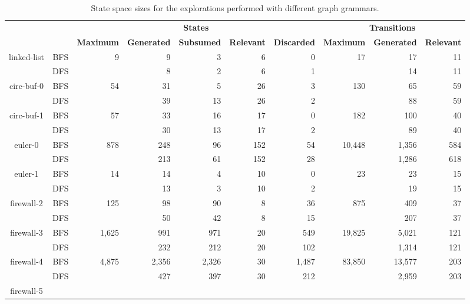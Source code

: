 \begin{table}[t]
\centering
\caption{State space sizes for the explorations performed with different graph
grammars.}
\scriptsize
\begin{tabular}{c|c|rrrrr|rrr}
\hline
\bf \multirow{2}{*}{Grammar} & \bf \multirow{2}{*}{Strat.} &
\multicolumn{5}{|c|}{\bf States} & \multicolumn{3}{|c}{\bf Transitions} \\
& & \bf Maximum & \bf Generated & \bf Subsumed & \bf Relevant & \bf Discarded
& \bf Maximum & \bf Generated & \bf Relevant \\
\hline
\multirow{2}{*}{linked-list} &
BFS & \multirow{2}{*}{9} & 9 & 3 & 6 & 0 & \multirow{2}{*}{17} & 17 & 11 \\
& DFS & & 8 & 2 & 6 & 1 & & 14 & 11 \\
\hline
\multirow{2}{*}{circ-buf-0} &
BFS & \multirow{2}{*}{54} & 31 &  5 & 26 & 3 & \multirow{2}{*}{130} & 65 & 59 \\
& DFS & & 39 & 13 & 26 & 2 & & 88 & 59 \\
\hline
\multirow{2}{*}{circ-buf-1} &
BFS & \multirow{2}{*}{57} & 33 & 16 & 17 & 0 & \multirow{2}{*}{182} & 100 & 40
\\
& DFS & & 30 & 13 & 17 & 2 & & 89 & 40 \\
\hline
\multirow{2}{*}{euler-0} &
BFS & \multirow{2}{*}{878} & 248 & 96 & 152 & 54 & \multirow{2}{*}{10,448} &
1,356 & 584 \\
& DFS & & 213 & 61 & 152 & 28 & & 1,286 & 618 \\
\hline
\multirow{2}{*}{euler-1} &
BFS & \multirow{2}{*}{14} & 14 & 4 & 10 & 0 & \multirow{2}{*}{23} & 23 & 15 \\
& DFS & & 13 & 3 & 10 & 2 & & 19 & 15 \\
\hline
\multirow{2}{*}{firewall-2} &
BFS & \multirow{2}{*}{125} & 98 & 90 & 8 & 36 & \multirow{2}{*}{875} & 409 & 37
\\
& DFS & & 50 & 42 & 8 & 15 & & 207 & 37 \\
\hline
\multirow{2}{*}{firewall-3} &
BFS & \multirow{2}{*}{1,625} & 991 & 971 & 20 & 549 & \multirow{2}{*}{19,825} &
5,021 & 121 \\
& DFS & & 232 & 212 & 20 & 102 & & 1,314 & 121 \\
\hline
\multirow{2}{*}{firewall-4} &
BFS & \multirow{2}{*}{4,875} & 2,356 & 2,326 & 30 & 1,487 &
\multirow{2}{*}{83,850} & 13,577 & 203 \\
& DFS & & 427 & 397 & 30 & 212 & & 2,959 & 203 \\
\hline
\multirow{2}{*}{firewall-5} &

\end{tabular}
\end{table}
